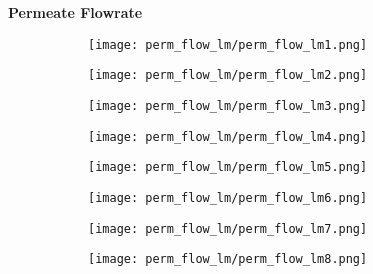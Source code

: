 \documentclass{article}
\begin{document}
    \textbf{Permeate Flowrate}
    \begin{figure}[H]
        \centering
        \begin{subfigure}{0.48\linewidth}
		    \texttt{[image: perm\_flow\_lm/perm\_flow\_lm1.png]}
	    \end{subfigure}
	    \begin{subfigure}{0.48\linewidth}
		    \texttt{[image: perm\_flow\_lm/perm\_flow\_lm2.png]}
	    \end{subfigure}
	    \begin{subfigure}{0.48\linewidth}
		    \texttt{[image: perm\_flow\_lm/perm\_flow\_lm3.png]}
	    \end{subfigure}
	    \begin{subfigure}{0.48\linewidth}
		    \texttt{[image: perm\_flow\_lm/perm\_flow\_lm4.png]}
	    \end{subfigure}
	    \begin{subfigure}{0.48\linewidth}
		    \texttt{[image: perm\_flow\_lm/perm\_flow\_lm5.png]}
	    \end{subfigure}
	    \begin{subfigure}{0.48\linewidth}
		    \texttt{[image: perm\_flow\_lm/perm\_flow\_lm6.png]}
	    \end{subfigure}
	    \begin{subfigure}{0.48\linewidth}
		    \texttt{[image: perm\_flow\_lm/perm\_flow\_lm7.png]}
	    \end{subfigure}
	    \begin{subfigure}{0.48\linewidth}
		    \texttt{[image: perm\_flow\_lm/perm\_flow\_lm8.png]}
	    \end{subfigure}
    \end{figure}
    
    \pagebreak
    
\end{document}

